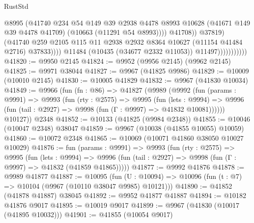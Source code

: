 \begin{lexlean}{RustStd}
\begin{coremodule}
                                        @8995
                                        (@41740
                                          @234
                                          @54
                                          @149
                                          @39
                                          @2938
                                          @4478
                                          @8993
                                          @10628
                                          (@41671 @149 @39 @4478 @41709)
                                          (@10663 (@11291 @54 @8993))))
                                      @41708))
                                  @37819)
                                (@41740
                                  @259
                                  @2105
                                  @115
                                  @11
                                  @2938
                                  @2932
                                  @8364
                                  @10627
                                  (@11154 @41484 @2716)
                                  @37833))))
                          @11484
                          (@10435 (@34677 @2332 @11053))
                          @11497)))))))))))
@41820 := @9950 @2145
@41824 := @9952 (@9956 @2145) (@9962 @2145)
@41825 := @9971 @38044
@41827 := @9967 (@41825 @9986)
@41829 := @10009 (@10010 @2145)
@41830 := @10005 @41829
@41832 := @9967 (@41830 @10034)
@41849 := @9966
    (fun (fn : @86) =>
    @41827
      (@9989
        (@9992
          (fun (params : @9991) =>
          @9993
            (fun (rty : @2575) =>
            @9995
              (fun (lets : @9994) =>
              @9996 (fun (tail : @2927) => @9998 (fun (Γ : @9997) => @41832 @10081))))))
        @10127))
    @2348
@41852 := @10133 (@41825 (@9984 @2348))
@41855 := @10046 (@10047 @2348) @38047
@41859 := @9967 (@10038 (@41855 @10055) @10059)
@41860 := @10072 @2348
@41865 := @10069 (@10071 @41860 @38050 @10027 @10029)
@41876 := fun (params : @9991) =>
  @9993
    (fun (rty : @2575) =>
    @9995
      (fun (lets : @9994) =>
      @9996 (fun (tail : @2927) => @9998 (fun (Γ : @9997) => @41832 (@41859 @41865)))))
@41877 := @9992 @41876
@41878 := @9989 @41877
@41887 := @10095
    (fun (U : @10094) => @10096 (fun (t : @7) => @10104 (@9967 (@10110 @38047 @9985) @10121)))
@41890 := @41852 (@41878 @41887) @38045
@41892 := @9952 @41877 @41887
@41894 := @10182 @41876 @9017
@41895 := @10019 @9017
@41899 := @9967 (@41830 (@10017 (@41895 @10032)))
@41901 := @41855 (@10054 @9017)

\end{coremodule}
\end{lexlean}
